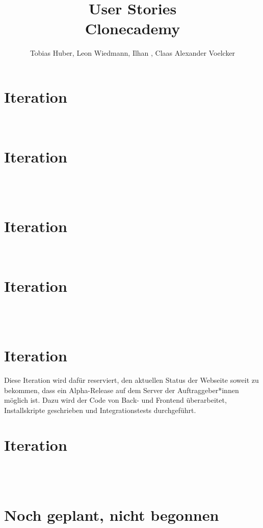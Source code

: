 \documentclass
[english,accentcolor=tud1c]
{tudreport}
\title{User Stories\\Clonecademy}
\author{Tobias Huber, Leon Wiedmann, Ilhan , Claas Alexander Voelcker}
\begin{document}

	\maketitle
	\tableofcontents


	\chapter{Iteration}

	 \\
	


	\chapter{Iteration}

	 \\
	 \\
	


	\chapter{Iteration}

	 \\
	


	\chapter{Iteration}

	\\
	\\
	
	
	\chapter{Iteration}
	
	Diese Iteration wird dafür reserviert, den aktuellen Status der Webseite soweit zu bekommen, dass ein Alpha-Release auf dem Server der Auftraggeber*innen möglich ist. Dazu wird der Code von Back- und Frontend überarbeitet, Installskripte geschrieben und Integrationstests durchgeführt.

	\chapter{Iteration}

	\\
	\\
	


\chapter*{Noch geplant, nicht begonnen}

	 \\
	
\end{document}
